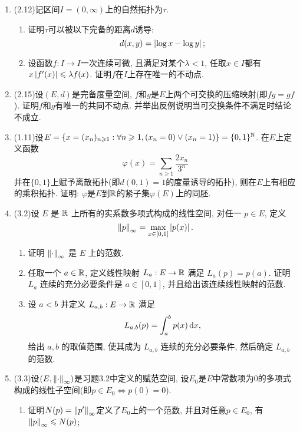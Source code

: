 \begin{enumerate}[label=\textbf{\arabic*.}, ref=\arabic*]
    \item (2.12)记区间$ I=(0,\infty) $上的自然拓扑为$ \tau $.
    \begin{enumerate}[(1)]
        \item 证明$ \tau $可以被以下完备的距离$ d $诱导:
            \[
            d(x,y)=\left| \log x-\log y \right| ;
            \]
        \item 设函数$ f : I\to I $一次连续可微, 且满足对某个$ \lambda<1 $, 任取$ x\in I $都有$ x\left| f'(x) \right| \leqslant\lambda f(x) $. 证明$ f $在$ I $上存在唯一的不动点. 
    \end{enumerate}
    \item (2.15)设$ (E,d) $是完备度量空间, $ f $和$ g $是$ E $上两个可交换的压缩映射(即$ fg=gf $). 证明$ f $和$ g $有唯一的共同不动点. 并举出反例说明当可交换条件不满足时结论不成立. 
    \item (1.11)设$ E=\{ x=(x_n)_{n\geqslant 1} : \forall n\geqslant 1, (x_n=0)\lor(x_n=1) \}=\{ 0,1 \}^{\mathbb{N}} $. 在$ E $上定义函数
        \[
        \varphi(x)=\sum_{n\geqslant 1}\frac{2x_n}{3^{n  }}
        \]
        并在$ \{ 0,1 \} $上赋予离散拓扑(即$ d(0,1)=1 $的度量诱导的拓扑), 则在$ E $上有相应的乘积拓扑. 证明: $ \varphi $是$ E $到$ \mathbb{R} $的紧子集$ \varphi(E) $上的同胚. 
    \item (3.2)设 $ E $ 是 $ \mathbb{R} $ 上所有的实系数多项式构成的线性空间, 对任一 $ p\in E $, 定义
        \[
            \left\| p \right\|_{\infty}=\max_{x\in[0, 1]}\left| p(x) \right| .
        \]
        \begin{enumerate}[(1)]
            \item 证明 $ \left\| \cdot \right\|_{\infty} $ 是 $ E $ 上的范数.
            \item 任取一个 $ a\in\mathbb{R} $, 定义线性映射 $ L_{a}:E\to \mathbb{R} $ 满足 $ L_{a}(p)=p(a) $. 证明 $ L_{a} $ 连续的充分必要条件是 $ a\in[0, 1] $, 并且给出该连续线性映射的范数.
            \item 设 $ a<b $ 并定义 $ L_{a, b}:E\to \mathbb{R} $ 满足
            \[
                L_{a, b}(p)=\int_{a}^{b}p(x)\,\mathrm{d} x,
            \]
            给出 $ a, b $ 的取值范围, 使其成为 $ L_{a, b} $ 连续的充分必要条件, 然后确定 $ L_{a, b} $ 的范数. 
        \end{enumerate}
    \item (3.3)设$ (E,\left\| \cdot \right\|_\infty) $是习题3.2中定义的赋范空间, 设$ E_0 $是$ E $中常数项为0的多项式构成的线性子空间(即$ p\in E_0\Longleftrightarrow p(0)=0 $).
        \begin{enumerate}[(1)]
        \item 证明$ N(p)=\left\| p' \right\|_\infty $定义了$ E_0 $上的一个范数, 并且对任意$ p\in E_0 $, 有$ \left\| p \right\|_\infty\leqslant N(p) $;

\end{enumerate}
\end{enumerate}
